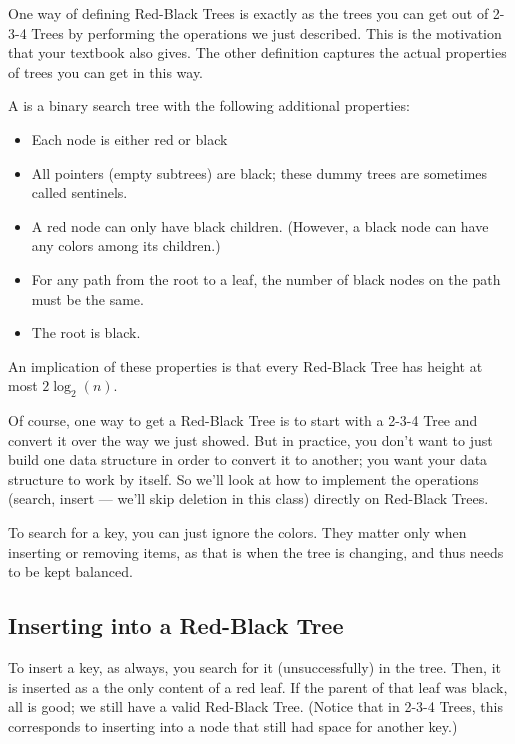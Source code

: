 One way of defining Red-Black Trees is exactly as the trees you can
get out of 2-3-4 Trees by performing the operations we just described.
This is the motivation that your textbook also gives.
The other definition captures the actual properties of trees you can
get in this way.

\begin{definition}
A  is a binary search tree with the following
additional properties:
\begin{itemize}
\item Each node is either red or black
\item All  pointers (empty subtrees) are black; these dummy
  trees are sometimes called sentinels.
\item A red node can only have black children.
      (However, a black node can have any colors among its children.)
\item For any path from the root to a leaf, the number of black nodes
  on the path must be the same.
\item The root is black.
\end{itemize}
\end{definition}
An implication of these properties is that every Red-Black Tree has
height at most $2 \log_2(n)$.

Of course, one way to get a Red-Black Tree is to start with a 2-3-4
Tree and convert it over the way we just showed. But in practice, you
don't want to just build one data structure in order to convert it to
another; you want your data structure to work by itself.
So we'll look at how to implement the operations (search, insert ---
we'll skip deletion in this class) directly on Red-Black Trees.

To search for a key, you can just ignore the colors. 
They matter only when inserting or removing items, as that is when the
tree is changing, and thus needs to be kept balanced.

\subsection{Inserting into a Red-Black Tree}
To insert a key, as always, you search for it (unsuccessfully) in the
tree. Then, it is inserted as a the only content of a red leaf.
If the parent of that leaf was black, all is good; we still have a
valid Red-Black Tree. (Notice that in 2-3-4 Trees, this corresponds to
inserting into a node that still had space for another key.)

